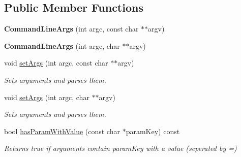 \subsection*{Public Member Functions}
\begin{DoxyCompactItemize}
\item 
\mbox{\label{classel_1_1base_1_1utils_1_1_command_line_args_a9872b14450e9cd1c1bd96227743c083b}} 
{\bfseries Command\+Line\+Args} (int argc, const char $\ast$$\ast$argv)
\item 
\mbox{\label{classel_1_1base_1_1utils_1_1_command_line_args_a297b31b31829d9545d6e808f4be9195c}} 
{\bfseries Command\+Line\+Args} (int argc, char $\ast$$\ast$argv)
\item 
\mbox{\label{classel_1_1base_1_1utils_1_1_command_line_args_a2d59b4184e0a6a314ef1c9a4c6d946e6}} 
void \hyperlink{classel_1_1base_1_1utils_1_1_command_line_args_a2d59b4184e0a6a314ef1c9a4c6d946e6}{set\+Args} (int argc, const char $\ast$$\ast$argv)
\begin{DoxyCompactList}\small\item\em Sets arguments and parses them. \end{DoxyCompactList}\item 
\mbox{\label{classel_1_1base_1_1utils_1_1_command_line_args_af88a16e6ce7b5d48f9679f304367b27a}} 
void \hyperlink{classel_1_1base_1_1utils_1_1_command_line_args_af88a16e6ce7b5d48f9679f304367b27a}{set\+Args} (int argc, char $\ast$$\ast$argv)
\begin{DoxyCompactList}\small\item\em Sets arguments and parses them. \end{DoxyCompactList}\item 
\mbox{\label{classel_1_1base_1_1utils_1_1_command_line_args_a4028414c53fbd2ebffbc2b88c6d13b09}} 
bool \hyperlink{classel_1_1base_1_1utils_1_1_command_line_args_a4028414c53fbd2ebffbc2b88c6d13b09}{has\+Param\+With\+Value} (const char $\ast$param\+Key) const
\begin{DoxyCompactList}\small\item\em Returns true if arguments contain param\+Key with a value (seperated by \textquotesingle{}=\textquotesingle{}) \end{DoxyCompactList}\item 

\end{DoxyCompactItemize}
